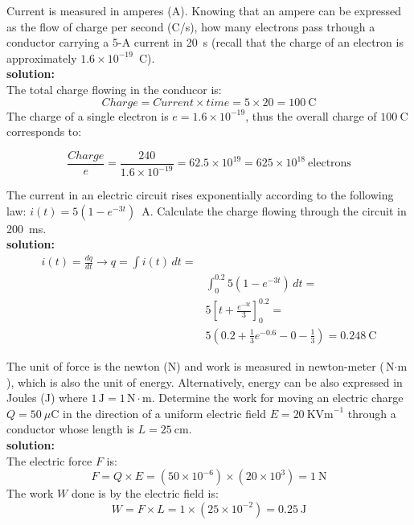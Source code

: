 \begin{exercise}
  Current is measured in amperes (A). Knowing that an ampere can be expressed as the flow of charge per second (C/s), how many electrons pass trhough a conductor carrying a 5-A current in 20~s (recall that the charge of an electron is approximately $1.6 \times 10^{-19}$~C).\\

\textbf{solution:}\\

The total charge flowing in the conducor is:
\[ Charge = Current \times time = 5 \times 20 = 100~\textrm{C}\]
The charge of a single electron is $e=1.6 \times 10^{-19}$, thus the overall charge of $100~\textrm{C}$ corresponds to:

\[\frac{Charge}{e} = \frac{240}{1.6\times 10^{-19}}=62.5 \times 10^{19} = 625 \times 10^{18}~\textrm{electrons}  \] 
\end{exercise}

\begin{exercise}
 The current in an electric circuit rises exponentially according to the following law: $i(t)=5(1-e^{-3t})$~A. Calculate the charge flowing through the circuit in 200~ms.\\

\textbf{solution:}\\
\begin{equation}
  \begin{split}
   i(t)=\frac{dq}{dt} \longrightarrow q =\int i(t)\,dt = \\
   & \int_0^{0.2}5(1-e^{-3t})\,dt = \\
   & 5\left[t + \frac{e^{-3t}}{3}\right]_0^{0.2}= \\
   & 5\left(0.2+\frac{1}{3}e^{-0.6}-0-\frac{1}{3}\right) =0.248~\textrm{C} \nonumber
   \end{split} 
\end{equation}
\end{exercise}

\begin{exercise}
 The unit of force is the newton (N) and work is measured in newton-meter ($\textrm{N} \cdot \textrm{m}$), which is also the unit of energy. Alternatively, energy can be also expressed in Joules (J) where $ 1\,\textrm{J} = 1\,\textrm{N}\cdot\textrm{m}$. Determine the work for moving an electric charge $Q=50~\mu\textrm{C}$ in the direction of a uniform electric field $E=20~\textrm{KVm}^{-1}$ through a conductor whose length is $L=25~\textrm{cm}$.\\

\textbf{solution:}\\
The electric force $F$ is:
\[F = Q \times E = (50 \times 10^{-6}) \times (20 \times 10^3) = 1~\textrm{N}\]
The work $W$ done is by the electric field is:
\[W = F \times L = 1 \times (25 \times 10^{-2}) = 0.25~\textrm{J}\] 
\end{exercise}

